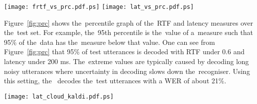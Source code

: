 \begin{figure*}[t]
    \begin{center}
    \texttt{[image: frtf\_vs\_prc.pdf.ps]}
    \texttt{[image: lat\_vs\_prc.pdf.ps]}
    \caption{The~percentile graphs show RTF and Latency scores for test data for =2000, =13, =5.
Note that 95 \% of utterances were decoded with the~latency lower that 200ms.}
    \label{fig:prc}
    \end{center}
\end{figure*}



Figure~\ref{fig:prc} shows the~percentile graph of the~RTF and latency measures over the~test set.
For example, the~95th percentile is the~value of a~measure such that 95\% of the~data has the~measure below that value.
One can see from Figure~\ref{fig:prc} that 95\% of test utterances is decoded with RTF under 0.6 and latency under 200 ms.
The~extreme values are typically caused by decoding long noisy utterances where uncertainty in decoding slows down the~recogniser.
Using this setting, the~ decodes the~test utterances with a WER of about 21\%.


\begin{figure*}[t]
    \begin{center}
    \texttt{[image: lat\_cloud\_kaldi.pdf.ps]}
    \caption{Shorter latency of custom on-line decoder (OnlineLatgenRecogniser) over batch decoding with cloud service (Google ASR service).}
    \label{fig:wer} 
    \end{center}
\end{figure*}

